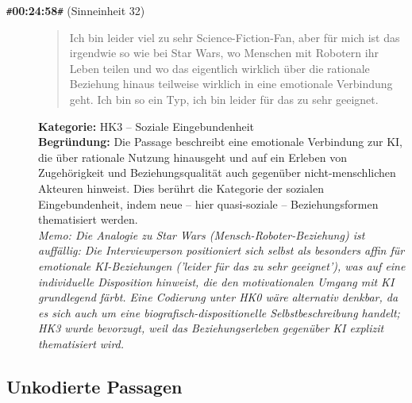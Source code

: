 \begin{description}
  \item[\texttt{\#}\textbf{00:24:58}\texttt{\#} (Sinneinheit 32)]
  \begin{quote}
  Ich bin leider viel zu sehr Science-Fiction-Fan, aber für mich ist das irgendwie so wie bei Star Wars, wo Menschen mit Robotern ihr Leben teilen und wo das eigentlich wirklich über die rationale Beziehung hinaus teilweise wirklich in eine emotionale Verbindung geht. Ich bin so ein Typ, ich bin leider für das zu sehr geeignet.
  \end{quote}
  \textbf{Kategorie:} HK3 -- Soziale Eingebundenheit\\
  \textbf{Begr\"undung:} Die Passage beschreibt eine emotionale Verbindung zur KI, die über rationale Nutzung hinausgeht und auf ein Erleben von Zugehörigkeit und Beziehungsqualität auch gegenüber nicht-menschlichen Akteuren hinweist. Dies berührt die Kategorie der sozialen Eingebundenheit, indem neue – hier quasi-soziale – Beziehungsformen thematisiert werden.
  \\\textit{Memo: Die Analogie zu Star Wars (Mensch-Roboter-Beziehung) ist auffällig: Die Interviewperson positioniert sich selbst als besonders affin für emotionale KI-Beziehungen ('leider für das zu sehr geeignet'), was auf eine individuelle Disposition hinweist, die den motivationalen Umgang mit KI grundlegend färbt. Eine Codierung unter HK0 wäre alternativ denkbar, da es sich auch um eine biografisch-dispositionelle Selbstbeschreibung handelt; HK3 wurde bevorzugt, weil das Beziehungserleben gegenüber KI explizit thematisiert wird.}
\end{description}
\medskip

\subsection*{Unkodierte Passagen}

